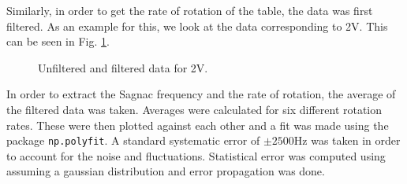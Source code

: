 \documentclass[a4paper]{report}
\numberwithin{equation}{section}
\begin{document}
Similarly, in order to get the rate of rotation of the table, the data was first filtered. As an example for this, we look at the data corresponding to 2V. This can be seen in Fig. \ref{fig:filter-freq}. 

\begin{figure}[h!]
	\centering
	\quad
	\centering
	\caption{Unfiltered and filtered data for 2V.}
	\label{fig:filter-freq}
\end{figure}


In order to extract the Sagnac frequency and the rate of rotation, the average of the filtered data was taken. Averages were calculated for six different rotation rates. These were then plotted against each other and a fit was made using the package \texttt{np.polyfit}. A standard systematic error of $\pm 2500 \text{Hz}$ was taken in order to account for the noise and fluctuations. Statistical error was computed using assuming a gaussian distribution and error propagation was done. 
\end{document}
